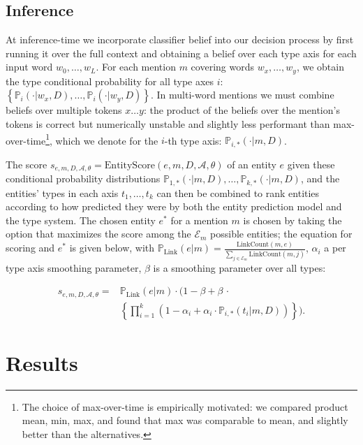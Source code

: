 \documentclass[letterpaper]{article}
\begin{document}
\subsection{Inference}
\label{para:inference-el}
At inference-time we incorporate classifier belief into our decision process by first running it over the full context and obtaining a belief over each type axis for each input word $w_0,\dots,w_L$. For each mention $m$ covering words $w_x,\dots,w_y$, we obtain the type conditional probability for all type axes $i$: $\left\{\mathbb P_i(\cdot|w_x,D),\dots,\mathbb P_i(\cdot|w_y,D)\right\}$. In multi-word mentions we must combine beliefs over multiple tokens $x\dots y$: the product of the beliefs over the mention's tokens is correct but numerically unstable and slightly less performant than max-over-time\footnote{The choice of max-over-time is empirically motivated: we compared product mean, min, max, and found that max was comparable to mean, and slightly better than the alternatives.}, which we denote for the $i$-th type axis: $\mathbb P_{i,*}(\cdot|m,D)$.

The score  $s_{e,m,D, \mathcal{A}, \theta} = \mathrm{EntityScore}(e,m,D, \mathcal{A}, \theta)$ of an entity $e$ given these conditional probability distributions $\mathbb P_{1,*}(\cdot|m,D),\dots,\mathbb P_{k,*}(\cdot|m,D)$, and the entities' types in each axis $t_1,\dots,t_k$ can then be combined to rank entities according to how predicted they were by both the entity prediction model and the type system. The chosen entity $e^*$ for a mention $m$ is chosen by taking the option that maximizes the score among the $\mathcal{E}_m$ possible entities; the equation for scoring and $e^*$ is given below, with $\mathbb P_{\mathrm{Link}}(e | m) = \frac{ \mathrm{LinkCount}(m, e) }{ \sum_{j \in \mathcal{E}_{m}}\mathrm{LinkCount}(m, j)}$, $\alpha_i$ a per type axis smoothing parameter, $\beta$ is a smoothing parameter over all types:

\begin{equation}
\begin{split}
s_{e,m,D, \mathcal{A}, \theta} =&\mathbb P_{\mathrm{Link}}(e | m) \cdot \Big(1 - \beta + \beta\,\cdot\\
  &\left\{\prod_{i=1}^k (1 - \alpha_i + \alpha_i \cdot \mathbb P_{i,*}(t_i|m,D)) \right\}\Big).
\end{split}
\end{equation}

\section{Results}
\end{document}

